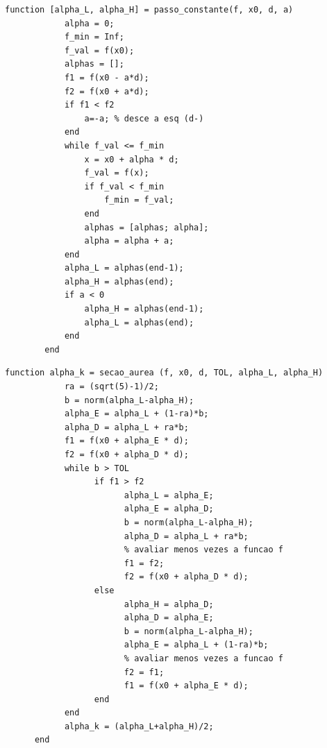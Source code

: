 \documentclass[10pt, a4paper]{article}
\begin{document}
\begin{minipage}{\linewidth}
      \begin{lstlisting}[style=myStyle, caption=script passo\_constante.m, label=list_passo_constante]
      function [alpha_L, alpha_H] = passo_constante(f, x0, d, a)
            alpha = 0;
            f_min = Inf;
            f_val = f(x0);
            alphas = [];
            f1 = f(x0 - a*d);
            f2 = f(x0 + a*d);
            if f1 < f2
                a=-a; % desce a esq (d-)
            end
            while f_val <= f_min
                x = x0 + alpha * d;
                f_val = f(x);
                if f_val < f_min
                    f_min = f_val;
                end
                alphas = [alphas; alpha];
                alpha = alpha + a;
            end
            alpha_L = alphas(end-1);
            alpha_H = alphas(end);
            if a < 0
                alpha_H = alphas(end-1);
                alpha_L = alphas(end);
            end
        end
      \end{lstlisting}
\end{minipage}

\begin{minipage}{\linewidth}
      \begin{lstlisting}[style=myStyle, caption=script secao\_aurea.m, label=list_secao_aurea]
      function alpha_k = secao_aurea (f, x0, d, TOL, alpha_L, alpha_H)
            ra = (sqrt(5)-1)/2;
            b = norm(alpha_L-alpha_H);
            alpha_E = alpha_L + (1-ra)*b;
            alpha_D = alpha_L + ra*b;
            f1 = f(x0 + alpha_E * d);
            f2 = f(x0 + alpha_D * d);
            while b > TOL
                  if f1 > f2
                        alpha_L = alpha_E;
                        alpha_E = alpha_D;
                        b = norm(alpha_L-alpha_H);
                        alpha_D = alpha_L + ra*b;
                        % avaliar menos vezes a funcao f
                        f1 = f2;
                        f2 = f(x0 + alpha_D * d);
                  else
                        alpha_H = alpha_D;
                        alpha_D = alpha_E;
                        b = norm(alpha_L-alpha_H);
                        alpha_E = alpha_L + (1-ra)*b;
                        % avaliar menos vezes a funcao f
                        f2 = f1;
                        f1 = f(x0 + alpha_E * d);
                  end
            end
            alpha_k = (alpha_L+alpha_H)/2;
      end
      \end{lstlisting}
\end{minipage}
\end{document}
